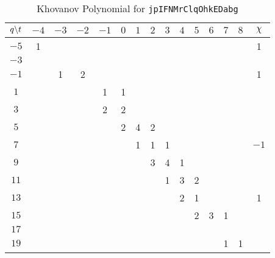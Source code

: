 \documentclass{article}
\theoremstyle{plain}
\begin{document}
        \begin{table}[H]
            \centering
            \begin{tabular}{| c | c | c | c | c | c | c | c | c | c | c | c | c | c | c |}
                \hline
                $q\symbol{92}t$&$-4$&$-3$&$-2$&$-1$&$0$&$1$&$2$&$3$&$4$&$5$&$6$&$7$&$8$&$\chi$\\
                \hline
                $-5$&1&&&&&&&&&&&&&1\\
                \hline
                $-3$&&&&&&&&&&&&&&\\
                \hline
                $-1$&&1&2&&&&&&&&&&&1\\
                \hline
                $1$&&&&1&1&&&&&&&&&\\
                \hline
                $3$&&&&2&2&&&&&&&&&\\
                \hline
                $5$&&&&&2&4&2&&&&&&&\\
                \hline
                $7$&&&&&&1&1&1&&&&&&$-1$\\
                \hline
                $9$&&&&&&&3&4&1&&&&&\\
                \hline
                $11$&&&&&&&&1&3&2&&&&\\
                \hline
                $13$&&&&&&&&&2&1&&&&1\\
                \hline
                $15$&&&&&&&&&&2&3&1&&\\
                \hline
                $17$&&&&&&&&&&&&&&\\
                \hline
                $19$&&&&&&&&&&&&1&1&\\
                \hline
            \end{tabular}
            \caption{Khovanov Polynomial for \texttt{jpIFNMrClqOhkEDabg}}
            \label{table:jpIFNMrClqOhkEDabg_kho}
        \end{table}
\end{document}

